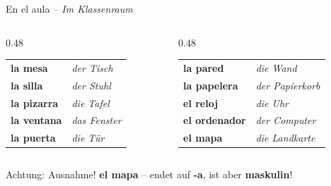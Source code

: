 \documentclass[aspectratio=169, 11pt]{beamer}
\newcommand{\es}[1]{\textbf{\textcolor{spanischrot}{#1}}}
\newcommand{\de}[1]{{\small\textcolor{dunkelgrau}{\textit{#1}}}}
\begin{document}
\begin{frame}{En el aula \de{-- Im Klassenraum}}

\begin{columns}[T]
\begin{column}{0.48\textwidth}
\begin{tabular}{@{}ll@{}}
\es{la mesa} & \de{der Tisch} \\[0.5em]
\es{la silla} & \de{der Stuhl} \\[0.5em]
\es{la pizarra} & \de{die Tafel} \\[0.5em]
\es{la ventana} & \de{das Fenster} \\[0.5em]
\es{la puerta} & \de{die Tür} \\
\end{tabular}
\end{column}

\begin{column}{0.48\textwidth}
\begin{tabular}{@{}ll@{}}
\es{la pared} & \de{die Wand} \\[0.5em]
\es{la papelera} & \de{der Papierkorb} \\[0.5em]
\es{el reloj} & \de{die Uhr} \\[0.5em]
\es{el ordenador} & \de{der Computer} \\[0.5em]
\es{el mapa} & \de{die Landkarte} \\
\end{tabular}
\end{column}
\end{columns}

\vspace{0.8cm}

\begin{alertblock}{Achtung: Ausnahme!}
\es{el mapa} -- endet auf \textbf{-a}, ist aber \textbf{maskulin}!
\end{alertblock}

\end{frame}
\end{document}
